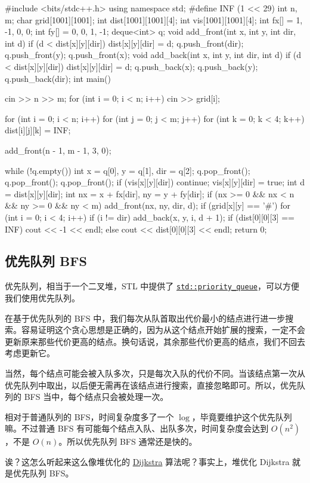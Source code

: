 \begin{cppcode}
#include <bits/stdc++.h>
using namespace std;
#define INF (1 << 29)
int n, m;
char grid[1001][1001];
int dist[1001][1001][4];
int vis[1001][1001][4];
int fx[] = {1, -1, 0, 0};
int fy[] = {0, 0, 1, -1};
deque<int> q;
void add_front(int x, int y, int dir, int d) {
  if (d < dist[x][y][dir]) {
    dist[x][y][dir] = d;
    q.push_front(dir);
    q.push_front(y);
    q.push_front(x);
  }
}
void add_back(int x, int y, int dir, int d) {
  if (d < dist[x][y][dir]) {
    dist[x][y][dir] = d;
    q.push_back(x);
    q.push_back(y);
    q.push_back(dir);
  }
}
int main() {
  cin >> n >> m;
  for (int i = 0; i < n; i++) cin >> grid[i];

  for (int i = 0; i < n; i++)
    for (int j = 0; j < m; j++)
      for (int k = 0; k < 4; k++) dist[i][j][k] = INF;

  add_front(n - 1, m - 1, 3, 0);

  while (!q.empty()) {
    int x = q[0], y = q[1], dir = q[2];
    q.pop_front();
    q.pop_front();
    q.pop_front();
    if (vis[x][y][dir]) continue;
    vis[x][y][dir] = true;
    int d = dist[x][y][dir];
    int nx = x + fx[dir], ny = y + fy[dir];
    if (nx >= 0 && nx < n && ny >= 0 && ny < m) add_front(nx, ny, dir, d);
    if (grid[x][y] == '#')
      for (int i = 0; i < 4; i++)
        if (i != dir) add_back(x, y, i, d + 1);
  }
  if (dist[0][0][3] == INF)
    cout << -1 << endl;
  else
    cout << dist[0][0][3] << endl;
  return 0;
}
\end{cppcode}

\subsection{优先队列 BFS}

优先队列，相当于一个二叉堆，STL 中提供了 \href{/ds/stl/priority_queue/}{\texttt{std::priority_queue}}，可以方便我们使用优先队列。

在基于优先队列的 BFS 中，我们每次从队首取出代价最小的结点进行进一步搜索。容易证明这个贪心思想是正确的，因为从这个结点开始扩展的搜索，一定不会更新原来那些代价更高的结点。换句话说，其余那些代价更高的结点，我们不回去考虑更新它。

当然，每个结点可能会被入队多次，只是每次入队的代价不同。当该结点第一次从优先队列中取出，以后便无需再在该结点进行搜索，直接忽略即可。所以，优先队列的 BFS 当中，每个结点只会被处理一次。

相对于普通队列的 BFS，时间复杂度多了一个 $\log$，毕竟要维护这个优先队列嘛。不过普通 BFS 有可能每个结点入队、出队多次，时间复杂度会达到 $O(n^2)$，不是 $O(n)$。所以优先队列 BFS 通常还是快的。

诶？这怎么听起来这么像堆优化的 \href{/graph/shortest-path/#dijkstra}{Dijkstra} 算法呢？事实上，堆优化 Dijkstra 就是优先队列 BFS。

